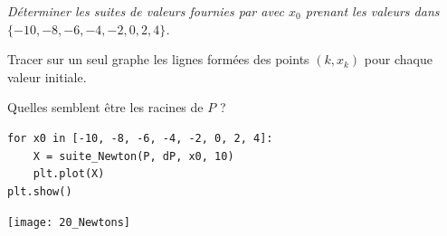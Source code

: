 \begin{Exercise}\it
Déterminer les suites de valeurs fournies par  avec $x_0$ prenant les valeurs dans $\{ -10, -8, -6, -4, -2, 0, 2, 4\}$. 

Tracer sur un seul graphe les lignes formées des points $(k,x_k)$ pour chaque valeur initiale.

Quelles semblent être les racines de $P$ ?

\end{Exercise}
\begin{Answer}
\begin{lstlisting}
for x0 in [-10, -8, -6, -4, -2, 0, 2, 4]:
    X = suite_Newton(P, dP, x0, 10)
    plt.plot(X)
plt.show()
\end{lstlisting}
\begin{center}
\texttt{[image: 20\_Newtons]}
\end{center}
\end{Answer}
